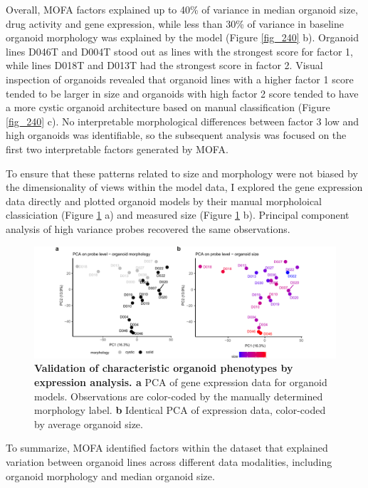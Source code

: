 \begin{flushleft}
\bigbreak
Overall, MOFA factors explained up to 40\% of variance in median organoid size, drug activity and gene expression, while less than 30\% of variance in baseline organoid morphology was explained by the model (Figure \ref{fig_240} b). Organoid lines D046T and D004T stood out as lines with the strongest score for factor 1, while lines D018T and D013T had the strongest score in factor 2. Visual inspection of organoids revealed that organoid lines with a higher factor 1 score tended to be larger in size and organoids with high factor 2 score tended to have a more cystic organoid architecture based on manual classification (Figure \ref{fig_240} c). No interpretable morphological differences between factor 3 low and high organoids was identifiable, so the subsequent analysis was focused on the first two interpretable factors generated by MOFA. 

\bigbreak
To ensure that these patterns related to size and morphology were not biased by the dimensionality of views within the model data, I explored the gene expression data directly and plotted organoid models by their manual morpholoical classiciation (Figure \ref{fig_241} a) and measured size (Figure \ref{fig_241} b). Principal component analysis of high variance probes recovered the same observations.

\begin{figure}[h!]
\centering
\includegraphics[width=\textwidth,
                height=\textheight,
                keepaspectratio]{figures/promise/pdf/fig_4_1.pdf}
\caption{\textbf{Validation of characteristic organoid phenotypes by expression analysis. a} PCA of gene expression data for organoid models. Observations are color-coded by the manually determined morphology label. \textbf{b} Identical PCA of expression data, color-coded by average organoid size.}
\label{fig_241}
\end{figure}

\bigbreak
To summarize, MOFA identified factors within the dataset that explained variation between organoid lines across different data modalities, including organoid morphology and median organoid size. 


\end{flushleft}
